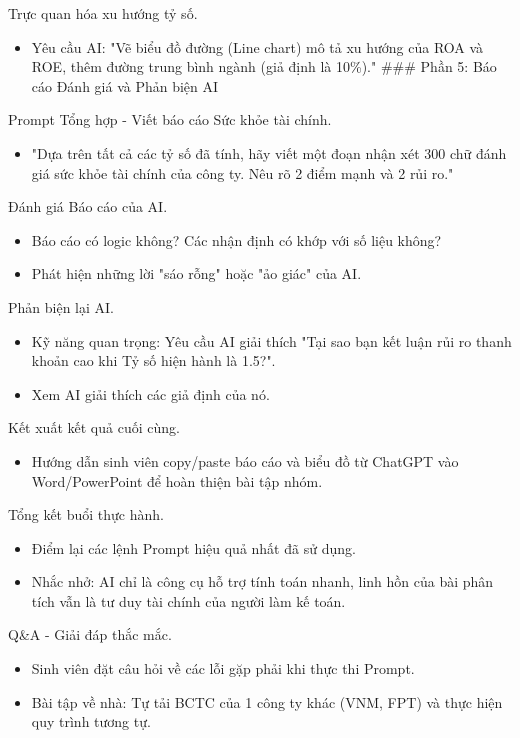 \documentclass[aspectratio=169]{beamer}
\begin{document}
\begin{frame}{Trực quan hóa xu hướng tỷ số.}
    \begin{itemize}
        \item Yêu cầu AI: "Vẽ biểu đồ đường (Line chart) mô tả xu hướng của ROA và ROE, thêm đường trung bình ngành (giả định là 10\%)."
        ### Phần 5: Báo cáo Đánh giá và Phản biện AI
    \end{itemize}
\end{frame}


\begin{frame}{Prompt Tổng hợp - Viết báo cáo Sức khỏe tài chính.}
    \begin{itemize}
        \item "Dựa trên tất cả các tỷ số đã tính, hãy viết một đoạn nhận xét 300 chữ đánh giá sức khỏe tài chính của công ty. Nêu rõ 2 điểm mạnh và 2 rủi ro."
    \end{itemize}
\end{frame}


\begin{frame}{Đánh giá Báo cáo của AI.}
    \begin{itemize}
        \item Báo cáo có logic không? Các nhận định có khớp với số liệu không?
        \item Phát hiện những lời "sáo rỗng" hoặc "ảo giác" của AI.
    \end{itemize}
\end{frame}


\begin{frame}{Phản biện lại AI.}
    \begin{itemize}
        \item Kỹ năng quan trọng: Yêu cầu AI giải thích "Tại sao bạn kết luận rủi ro thanh khoản cao khi Tỷ số hiện hành là 1.5?".
        \item Xem AI giải thích các giả định của nó.
    \end{itemize}
\end{frame}


\begin{frame}{Kết xuất kết quả cuối cùng.}
    \begin{itemize}
        \item Hướng dẫn sinh viên copy/paste báo cáo và biểu đồ từ ChatGPT vào Word/PowerPoint để hoàn thiện bài tập nhóm.
    \end{itemize}
\end{frame}


\begin{frame}{Tổng kết buổi thực hành.}
    \begin{itemize}
        \item Điểm lại các lệnh Prompt hiệu quả nhất đã sử dụng.
        \item Nhắc nhở: AI chỉ là công cụ hỗ trợ tính toán nhanh, linh hồn của bài phân tích vẫn là tư duy tài chính của người làm kế toán.
    \end{itemize}
\end{frame}


\begin{frame}{Q\&A - Giải đáp thắc mắc.}
    \begin{itemize}
        \item Sinh viên đặt câu hỏi về các lỗi gặp phải khi thực thi Prompt.
        \item Bài tập về nhà: Tự tải BCTC của 1 công ty khác (VNM, FPT) và thực hiện quy trình tương tự.
    \end{itemize}
\end{frame}
\end{document}
